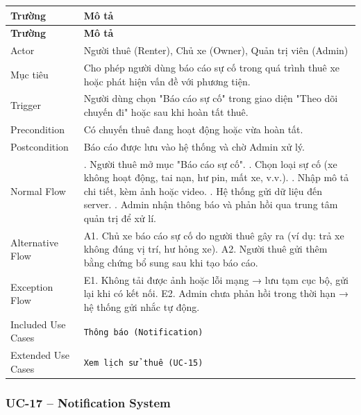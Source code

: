 \begin{longtable}{|>{\raggedright\arraybackslash}p{4cm}|>{\raggedright\arraybackslash}p{11cm}|}
\hline
\textbf{Trường} & \textbf{Mô tả} \\
\hline
\endfirsthead

\hline
\textbf{Trường} & \textbf{Mô tả} \\
\hline
\endhead

\hline
\endfoot

Actor & Người thuê (Renter), Chủ xe (Owner), Quản trị viên (Admin) \\
\hline
Mục tiêu & Cho phép người dùng báo cáo sự cố trong quá trình thuê xe hoặc phát hiện vấn đề với phương tiện. \\
\hline
Trigger & Người dùng chọn "Báo cáo sự cố" trong giao diện "Theo dõi chuyến đi" hoặc sau khi hoàn tất thuê. \\
\hline
Precondition & Có chuyến thuê đang hoạt động hoặc vừa hoàn tất. \\
\hline
Postcondition & Báo cáo được lưu vào hệ thống và chờ Admin xử lý. \\
\hline
Normal Flow & 1. Người thuê mở mục "Báo cáo sự cố". \newline 2. Chọn loại sự cố (xe không hoạt động, tai nạn, hư pin, mất xe, v.v.). \newline 3. Nhập mô tả chi tiết, kèm ảnh hoặc video. \newline 4. Hệ thống gửi dữ liệu đến server. \newline 5. Admin nhận thông báo và phản hồi qua trung tâm quản trị để xử lí. \\
\hline
Alternative Flow & A1. Chủ xe báo cáo sự cố do người thuê gây ra (ví dụ: trả xe không đúng vị trí, hư hỏng xe). \newline A2. Người thuê gửi thêm bằng chứng bổ sung sau khi tạo báo cáo. \\
\hline
Exception Flow & E1. Không tải được ảnh hoặc lỗi mạng → lưu tạm cục bộ, gửi lại khi có kết nối. \newline E2. Admin chưa phản hồi trong thời hạn → hệ thống gửi nhắc tự động. \\
\hline
Included Use Cases & \texttt{Thông báo (Notification)} \\
\hline
Extended Use Cases & \texttt{Xem lịch sử thuê (UC-15)} \\
\hline
\end{longtable}

\subsubsection*{UC-17 – Notification System}

